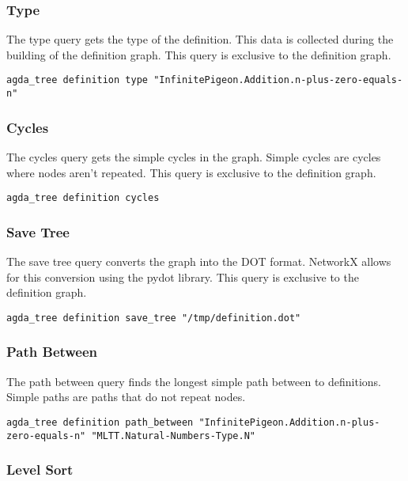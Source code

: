 \subsubsection{Type}

The type query gets the type of the definition. This data is collected during
the building of the definition graph. This query is exclusive to the definition
graph. 

\begin{lstlisting}
agda_tree definition type "InfinitePigeon.Addition.n-plus-zero-equals-n"
\end{lstlisting}

\subsubsection{Cycles}

The cycles query gets the simple cycles in the graph. Simple cycles are cycles
where nodes aren't repeated. This query is exclusive to the definition graph. 

\begin{lstlisting}
agda_tree definition cycles
\end{lstlisting}

\subsubsection{Save Tree}

The save tree query converts the graph into the DOT format. NetworkX allows for
this conversion using the pydot library. This query is exclusive to the
definition graph. 

\begin{lstlisting}
agda_tree definition save_tree "/tmp/definition.dot"
\end{lstlisting}

\subsubsection{Path Between}

The path between query finds the longest simple path between to definitions.
Simple paths are paths that do not repeat nodes. 

\begin{lstlisting}
agda_tree definition path_between "InfinitePigeon.Addition.n-plus-zero-equals-n" "MLTT.Natural-Numbers-Type.N"
\end{lstlisting}

\subsubsection{Level Sort}

